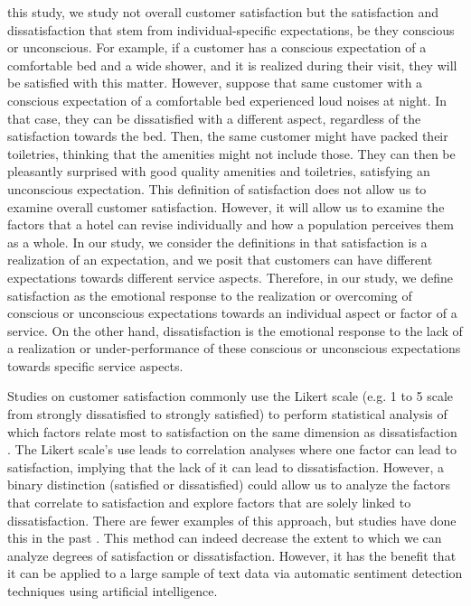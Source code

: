 \documentclass[smallextended,natbib]{svjour3}       %
\providecommand{\DIFadd}[1]{{\protect\color{blue}\uwave{#1}}} %
\providecommand{\DIFaddend}{} %
\DeclareRobustCommand{\DIFaddend}{\DIFOaddend \let\includegraphics\DIFOincludegraphics} %
\begin{document}
    \DIFadd{In }\DIFaddend this study, we study not overall customer satisfaction but the satisfaction and dissatisfaction that stem from individual-specific expectations, be they conscious or unconscious. For example, if a customer has a conscious expectation of a comfortable bed and a wide shower, and it is realized during their visit, they will be satisfied with this matter. However, suppose that same customer with a conscious expectation of a comfortable bed experienced loud noises at night. In that case, they can be dissatisfied with a different aspect, regardless of the satisfaction towards the bed. Then, the same customer might have packed their toiletries, thinking that the amenities might not include those. They can then be pleasantly surprised with good quality amenities and toiletries, satisfying an unconscious expectation. This definition of satisfaction does not allow us to examine overall customer satisfaction. However, it will allow us to examine the factors that a hotel can revise individually and how a population perceives them as a whole. In our study, we consider the definitions in \cite{hunt1975} that satisfaction is a realization of an expectation, and we posit that customers can have different expectations towards different service aspects. Therefore, in our study, we define satisfaction as the emotional response to the realization or overcoming of conscious or unconscious expectations towards an individual aspect or factor of a service. On the other hand, dissatisfaction is the emotional response to the lack of a realization or under-performance of these conscious or unconscious expectations towards specific service aspects.

    Studies on customer satisfaction \cite[e.g.][]{truong2009, romao2014, wu2009} commonly use the Likert scale \cite[][]{likert1932technique} (e.g. 1 to 5 scale from strongly dissatisfied to strongly satisfied) to perform statistical analysis of which factors relate most to satisfaction on the same dimension as dissatisfaction \cite[e.g.][]{chan201518, choi2000}. The Likert scale's use leads to correlation analyses where one factor can lead to satisfaction, implying that the lack of it can lead to dissatisfaction. However, a binary distinction (satisfied or dissatisfied) could allow us to analyze the factors that correlate to satisfaction and explore factors that are solely linked to dissatisfaction. There are fewer examples of this approach, but studies have done this in the past \cite[e.g.][]{zhou2014}. This method can indeed decrease the extent to which we can analyze degrees of satisfaction or dissatisfaction. However, it has the benefit that it can be applied to a large sample of text data via automatic sentiment detection techniques using artificial intelligence. 
\end{document}
